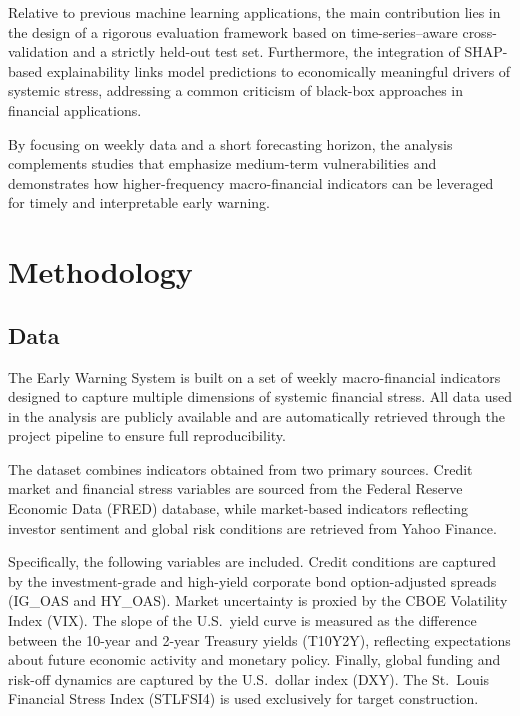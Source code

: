 \documentclass[11pt,a4paper]{article}
\begin{document}
Relative to previous machine learning applications, the main contribution lies in the design of a rigorous evaluation framework based on time-series–aware cross-validation and a strictly held-out test set. Furthermore, the integration of SHAP-based explainability links model predictions to economically meaningful drivers of systemic stress, addressing a common criticism of black-box approaches in financial applications.

By focusing on weekly data and a short forecasting horizon, the analysis complements studies that emphasize medium-term vulnerabilities and demonstrates how higher-frequency macro-financial indicators can be leveraged for timely and interpretable early warning.

\section{Methodology}
\label{sec:methodology}

\subsection{Data}
\label{subsec:data}

The Early Warning System is built on a set of weekly macro-financial indicators designed to capture multiple dimensions of systemic financial stress. All data used in the analysis are publicly available and are automatically retrieved through the project pipeline to ensure full reproducibility.

The dataset combines indicators obtained from two primary sources. Credit market and financial stress variables are sourced from the Federal Reserve Economic Data (FRED) database, while market-based indicators reflecting investor sentiment and global risk conditions are retrieved from Yahoo Finance.

Specifically, the following variables are included. Credit conditions are captured by the investment-grade and high-yield corporate bond option-adjusted spreads (IG\_OAS and HY\_OAS). Market uncertainty is proxied by the CBOE Volatility Index (VIX). The slope of the U.S.\ yield curve is measured as the difference between the 10-year and 2-year Treasury yields (T10Y2Y), reflecting expectations about future economic activity and monetary policy. Finally, global funding and risk-off dynamics are captured by the U.S.\ dollar index (DXY). The St.\ Louis Financial Stress Index (STLFSI4) is used exclusively for target construction.
\end{document}
